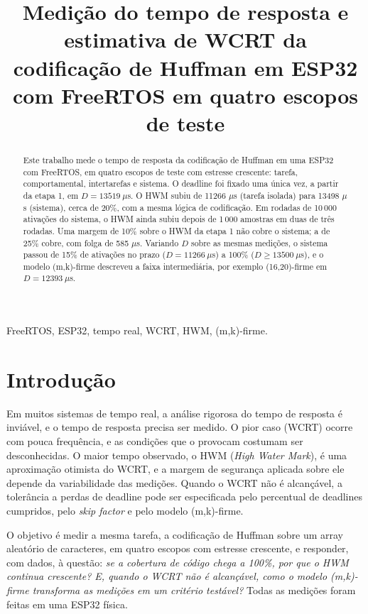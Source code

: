 \documentclass[conference,a4paper]{IEEEtran}
\title{Medição do tempo de resposta e estimativa de WCRT da codificação de Huffman em ESP32 com FreeRTOS em quatro escopos de teste}
\author{\IEEEauthorblockN{[Nome do integrante 1] (RA [RA 1]) e [Nome do integrante 2] (RA [RA 2])}
\IEEEauthorblockA{Engenharia de Computação --- Universidade do Vale do Itajaí (UNIVALI)\\Sistemas em Tempo Real --- Atividade M3\\Professores: Michael Douglas C A e Felipe Viel}}
\begin{document}
\maketitle

\begin{abstract}
Este trabalho mede o tempo de resposta da codificação de Huffman em uma ESP32 com FreeRTOS, em quatro escopos de teste com estresse crescente: tarefa, comportamental, intertarefas e sistema. O deadline foi fixado uma única vez, a partir da etapa 1, em $D = 13519\ \mu$s. O HWM subiu de 11266 $\mu$s (tarefa isolada) para 13498 $\mu$s (sistema), cerca de 20\%, com a mesma lógica de codificação. Em rodadas de 10\,000 ativações do sistema, o HWM ainda subiu depois de 1\,000 amostras em duas de três rodadas. Uma margem de 10\% sobre o HWM da etapa 1 não cobre o sistema; a de 25\% cobre, com folga de 585 $\mu$s. Variando $D$ sobre as mesmas medições, o sistema passou de 15\% de ativações no prazo ($D = 11266\ \mu$s) a 100\% ($D \geq 13500\ \mu$s), e o modelo (m,k)-firme descreveu a faixa intermediária, por exemplo (16,20)-firme em $D = 12393\ \mu$s.
\end{abstract}

\begin{IEEEkeywords}
FreeRTOS, ESP32, tempo real, WCRT, HWM, (m,k)-firme.
\end{IEEEkeywords}

\section{Introdução}
Em muitos sistemas de tempo real, a análise rigorosa do tempo de resposta é inviável, e o tempo de resposta precisa ser medido. O pior caso (WCRT) ocorre com pouca frequência, e as condições que o provocam costumam ser desconhecidas. O maior tempo observado, o HWM (\emph{High Water Mark}), é uma aproximação otimista do WCRT, e a margem de segurança aplicada sobre ele depende da variabilidade das medições. Quando o WCRT não é alcançável, a tolerância a perdas de deadline pode ser especificada pelo percentual de deadlines cumpridos, pelo \emph{skip factor} e pelo modelo (m,k)-firme.

O objetivo é medir a mesma tarefa, a codificação de Huffman sobre um array aleatório de caracteres, em quatro escopos com estresse crescente, e responder, com dados, à questão: \emph{se a cobertura de código chega a 100\%, por que o HWM continua crescente? E, quando o WCRT não é alcançável, como o modelo (m,k)-firme transforma as medições em um critério testável?} Todas as medições foram feitas em uma ESP32 física.
\end{document}
